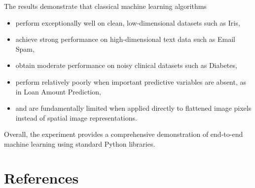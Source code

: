 \documentclass[12pt,a4paper]{article}
\begin{document}
The results demonstrate that classical machine learning algorithms

\begin{itemize}
    \item perform exceptionally well on clean, low-dimensional datasets
          such as Iris,

    \item achieve strong performance on high-dimensional text data such
          as Email Spam,

    \item obtain moderate performance on noisy clinical datasets such as
          Diabetes,

    \item perform relatively poorly when important predictive variables
          are absent, as in Loan Amount Prediction,

    \item and are fundamentally limited when applied directly to
          flattened image pixels instead of spatial image
          representations.
\end{itemize}

Overall, the experiment provides a comprehensive demonstration of
end-to-end machine learning using standard Python libraries.

\section{References}
\end{document}

